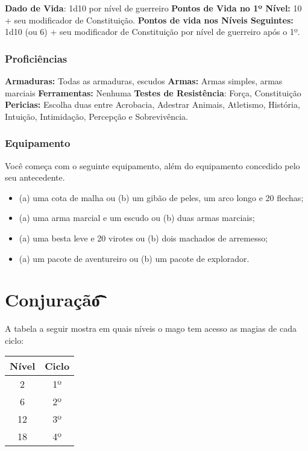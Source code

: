 \documentclass{RPG_Adventure}[2021/10/20]
\begin{document}
\textbf{Dado de Vida}: 1d10 por nível de guerreiro \nl
\textbf{Pontos de Vida no 1º Nível:} 10 + seu modificador de Constituição. \nl
\textbf{Pontos de vida nos Níveis Seguintes:} 1d10 (ou 6) + seu modificador de
Constituição por nível de guerreiro após o 1º.

\subsubsection{Proficiências}%
\label{ssub:proficiencias}

\textbf{Armaduras:} Todas as armaduras, escudos \nl
\textbf{Armas:} Armas simples, armas marciais \nl
\textbf{Ferramentas:} Nenhuma \jump
\textbf{Testes de Resistência}: Força, Constituição \nl
\textbf{Pericias:} Escolha duas entre Acrobacia, Adestrar Animais, Atletismo,
História, Intuição, Intimidação, Percepção e Sobrevivência.

\subsubsection{Equipamento}%
\label{ssub:equipamento}

Você começa com o seguinte equipamento, além do equipamento concedido pelo seu
antecedente.
\begin{itemize}
    \item (a) uma cota de malha ou (b) um gibão de peles, um arco longo e 20
        flechas;
    \item (a) uma arma marcial e um escudo ou (b) duas armas marciais;
    \item (a) uma besta leve e 20 virotes ou (b) dois machados de arremesso;
    \item (a) um pacote de aventureiro ou (b) um pacote de explorador.
\end{itemize}

\section*{Conjuração\t\t\t\t\t\t\t\t\t\t\t}%
\label{sec:conjuracao}

A tabela a seguir mostra em quais níveis o mago tem acesso as magias de cada
ciclo:

\begin{center}
\begin{tabular}{|||c||c|||}
    \hline
    \textbf{Nível} & \textbf{Ciclo} \\
    \hline
    2 & 1º \\
    \hline
    6 & 2º \\
    \hline
    12 & 3º \\
    \hline
    18 & 4º \\
    \hline
\end{tabular}
\end{center}
\end{document}
